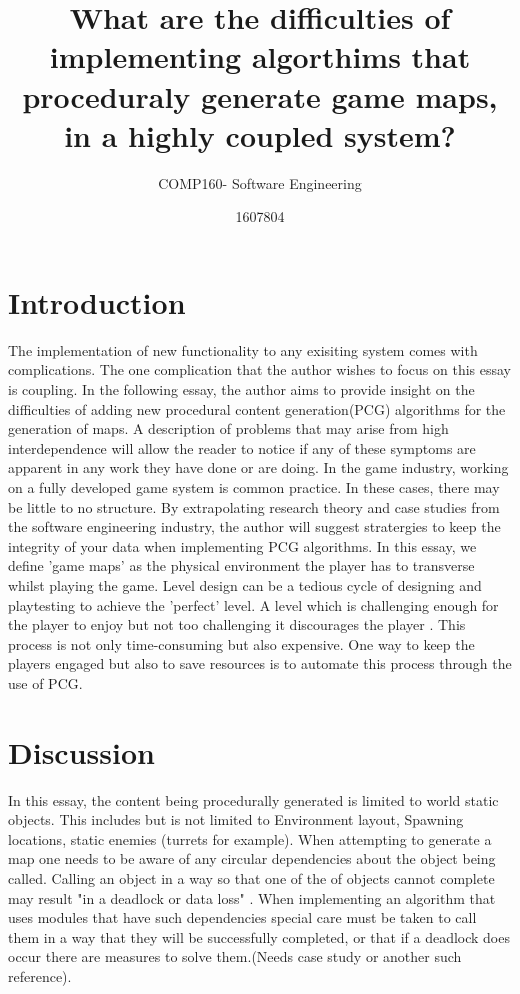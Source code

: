 \documentclass{scrartcl}
\title{What are the difficulties of implementing algorthims that proceduraly generate game maps, in a highly coupled system?}
\subtitle{COMP160- Software Engineering}
\author{1607804}
\begin{document}
\maketitle


\section{Introduction}
The implementation of new functionality to any exisiting system comes with complications. The one complication that the author wishes to focus on this essay is coupling. In the following essay, the author aims to provide insight on the difficulties of adding new procedural content generation(PCG) algorithms for the generation of maps. A description of problems that may arise from high interdependence will allow the reader to notice if any of these symptoms are apparent in any work they have done or are doing. In the game industry, working on a fully developed game system is common practice. In these cases, there may be little to no structure. By extrapolating research theory and case studies from the software engineering industry, the author will suggest stratergies to keep the integrity of your data when implementing PCG algorithms. In this essay, we define 'game maps' as the physical environment the player has to transverse whilst playing the game. Level design can be a tedious cycle of designing and playtesting to achieve the 'perfect' level. A level which is challenging enough for the player to enjoy but not too challenging it discourages the player \cite {kayali2011retro}. This process is not only time-consuming but also expensive. One way to keep the players engaged but also to save resources is to automate this process through the use of PCG.  

\section{Discussion}
In this essay, the content being procedurally generated is limited to world static objects. This includes but is not limited to Environment layout, Spawning locations, static enemies (turrets for example). When attempting to generate a map one needs to be aware of any circular dependencies about the object being called. Calling an object in a way so that one of the of objects cannot complete may result "in a deadlock or data loss" \cite {nair2016solving}. When implementing an algorithm that uses modules that have such dependencies special care must be taken to call them in a way that they will be successfully completed, or that if a deadlock does occur there are measures to solve them.(Needs case study or another such reference).
\end{document}
